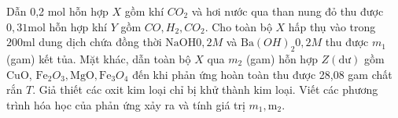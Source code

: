\begin{vd}
	Dẫn 0,2 mol hỗn hợp $X$ gồm khí $CO_2$ và hơi nước qua than nung đỏ thu được $0,31\mathrm{mol}$ hỗn hợp khí $Y$ gồm $CO, H_2, CO_2$. Cho toàn bộ $X$ hấp thụ vào trong $200\mathrm{ml}$ dung dịch chứa đồng thời $\mathrm{NaOH} 0,2M$ và $\mathrm{Ba}(OH)_2 0,2M$ thu được $m_1$ (gam) kết tủa. Mặt khác, dẫn toàn bộ $X$ qua $m_2$ (gam) hỗn hợp $Z(\mathrm{dư})$ gồm $\mathrm{CuO}$, $\mathrm{Fe}_2 O_3, \mathrm{MgO}, \mathrm{Fe}_3 O_4$ đến khi phản ứng hoàn toàn thu được 28,08 gam chất rắn $T$. Giả thiết các oxit kim loại chỉ bị khử thành kim loại. Viết các phương trình hóa học của phản ứng xảy ra và tính giá trị $m_1, \mathrm{m}_2$.
\end{vd}
